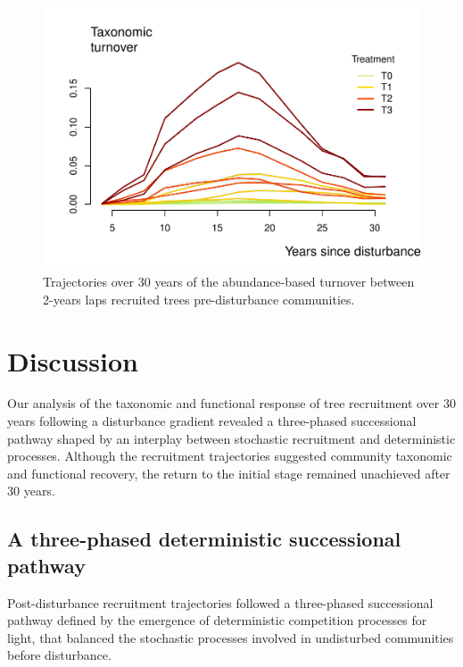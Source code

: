 \documentclass[fleqn,10pt]{ArtEcoFoG} %
\begin{document}
\begin{figure}

{\centering \includegraphics[width=1\linewidth]{RecruitmentTrajectories_files/figure-latex/Turnover-1} 

}

\caption{Trajectories over 30 years of the abundance-based turnover between 2-years laps recruited trees pre-disturbance communities.}\label{fig:Turnover}
\end{figure}

\section{Discussion}\label{discussion}

Our analysis of the taxonomic and functional response of tree
recruitment over 30 years following a disturbance gradient revealed a
three-phased successional pathway shaped by an interplay between
stochastic recruitment and deterministic processes. Although the
recruitment trajectories suggested community taxonomic and functional
recovery, the return to the initial stage remained unachieved after 30
years.

\subsection{A three-phased deterministic successional
pathway}\label{a-three-phased-deterministic-successional-pathway}

Post-disturbance recruitment trajectories followed a three-phased
successional pathway defined by the emergence of deterministic
competition processes for light, that balanced the stochastic processes
involved in undisturbed communities before disturbance.
\end{document}
